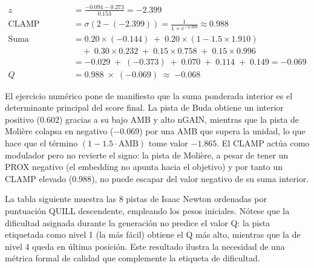 \documentclass[../main.tex]{subfiles}
\begin{document}
\begin{align}
z &= \frac{-0.094 - 0.273}{0.153} = -2.399 \\[4pt]
\text{CLAMP} &= \sigma(2 - (-2.399)) = \frac{1}{1 + e^{-4.399}} \approx 0.988 \\[4pt]
\text{Suma ponderada} &= 0.20 \times (-0.144) \;+\; 0.20 \times (1 - 1.5 \times 1.910) \nonumber \\
&\quad +\; 0.30 \times 0.232 \;+\; 0.15 \times 0.758 \;+\; 0.15 \times 0.996 \nonumber \\
&= -0.029 \;+\; (-0.373) \;+\; 0.070 \;+\; 0.114 \;+\; 0.149 = -0.069 \\[4pt]
Q &= 0.988 \;\times\; (-0.069) \;\approx\; \mathbf{-0.068}
\end{align}

El ejercicio numérico pone de manifiesto que la suma ponderada interior es el determinante principal del score final. La pista de Buda obtiene un interior positivo (0.602) gracias a su bajo AMB y alto nGAIN, mientras que la pista de Molière colapsa en negativo ($-0.069$) por una AMB que supera la unidad, lo que hace que el término $(1-1.5 \cdot \text{AMB})$ tome valor $-1.865$. El CLAMP actúa como modulador pero no revierte el signo: la pista de Molière, a pesar de tener un PROX negativo (el embedding no apunta hacia el objetivo) y por tanto un CLAMP elevado ($0.988$), no puede escapar del valor negativo de su suma interior.

La tabla siguiente muestra las 8 pistas de Isaac Newton ordenadas por puntuación QUILL descendente, empleando los pesos iniciales. Nótese que la dificultad asignada durante la generación no predice el valor Q: la pista etiquetada como nivel 1 (la más fácil) obtiene el Q más alto, mientras que la de nivel 4 queda en última posición. Este resultado ilustra la necesidad de una métrica formal de calidad que complemente la etiqueta de dificultad.
\end{document}
